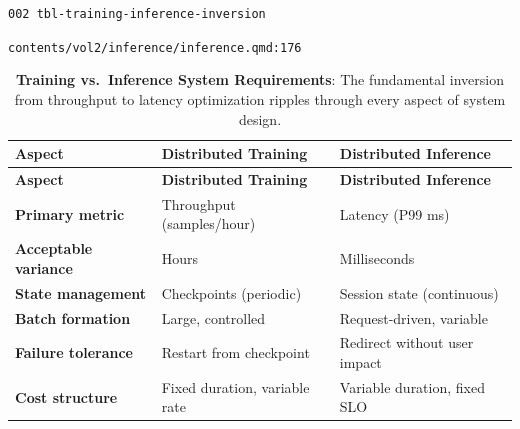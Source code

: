 \documentclass[
  twoside]{scrbook}
\makeatletter
\newif\ifmlsys@inside@longtable
\newif\ifmlsys@longtable@numbered
\let\mlsys@orig@label\label
\renewcommand{\label}[1]{%
  \ifmlsys@inside@longtable
    \global\mlsys@longtable@numberedtrue
  \fi
  \mlsys@orig@label{#1}%
}
\makeatother
\begin{document}
\clearpage

\texttt{002\ tbl-training-inference-inversion}

\texttt{contents/vol2/inference/inference.qmd:176}

\begin{longtable}[]{@{}
  >{\raggedright\arraybackslash}p{}
  >{\centering\arraybackslash}p{}
  >{\centering\arraybackslash}p{}@{}}
\caption{\textbf{Training vs.~Inference System Requirements}: The
fundamental inversion from throughput to latency optimization ripples
through every aspect of system
design.}\label{tbl-training-inference-inversion}\tabularnewline
\toprule\noalign{}
\begin{minipage}[b]{\linewidth}\raggedright
\textbf{Aspect}
\end{minipage} & \begin{minipage}[b]{\linewidth}\centering
\textbf{Distributed Training}
\end{minipage} & \begin{minipage}[b]{\linewidth}\centering
\textbf{Distributed Inference}
\end{minipage} \\
\midrule\noalign{}
\endfirsthead
\toprule\noalign{}
\begin{minipage}[b]{\linewidth}\raggedright
\textbf{Aspect}
\end{minipage} & \begin{minipage}[b]{\linewidth}\centering
\textbf{Distributed Training}
\end{minipage} & \begin{minipage}[b]{\linewidth}\centering
\textbf{Distributed Inference}
\end{minipage} \\
\midrule\noalign{}
\endhead
\bottomrule\noalign{}
\endlastfoot
\textbf{Primary metric} & Throughput (samples/hour) & Latency (P99
ms) \\
\textbf{Acceptable variance} & Hours & Milliseconds \\
\textbf{State management} & Checkpoints (periodic) & Session state
(continuous) \\
\textbf{Batch formation} & Large, controlled & Request-driven,
variable \\
\textbf{Failure tolerance} & Restart from checkpoint & Redirect without
user impact \\
\textbf{Cost structure} & Fixed duration, variable rate & Variable
duration, fixed SLO \\
\end{longtable}
\end{document}
